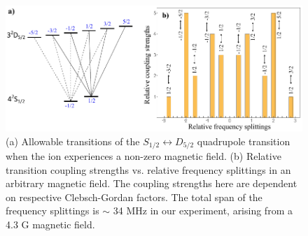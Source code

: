 \begin{figure}[t]
    \begin{center}
        \includegraphics{figures/2/Fig_ZeemanSplits}
        \caption{\label{fig:ZeemanSplits} (a) Allowable transitions of the $S_{1/2} \leftrightarrow D_{5/2}$ quadrupole transition when the ion experiences a non-zero magnetic field. (b) Relative transition coupling strengths vs. relative frequency splittings in an arbitrary magnetic field. The coupling strengths here are dependent on respective Clebsch-Gordan factors. The total span of the frequency splittings is $\sim$ 34 MHz in our experiment, arising from a 4.3 G magnetic field.   }
    \end{center}
\end{figure}

